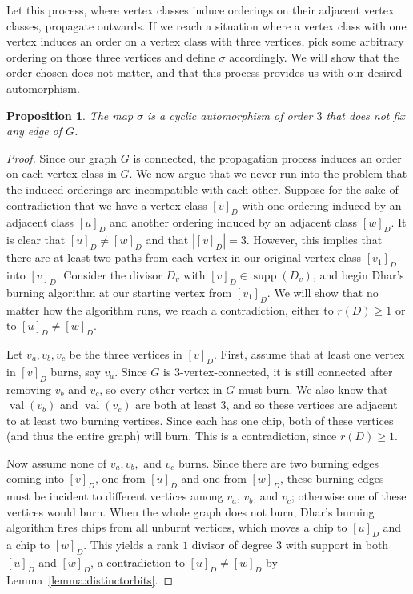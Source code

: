 \documentclass[10pt]{amsart}
\newtheorem{prop}[theorem]{Proposition}
\DeclareMathOperator{\val}{val}
\DeclareMathOperator{\supp}{supp}
\begin{document}
Let this process, where vertex classes induce orderings on their adjacent vertex classes, propagate outwards. If we reach a situation where a vertex class with one vertex induces an order on a vertex class with three vertices, pick some arbitrary ordering on those three vertices and define $\sigma$ accordingly. We will show that the order chosen does not matter, and that this process provides us with our desired automorphism.

\begin{prop}
\label{prop:cyclic}
The map $\sigma$ is a cyclic automorphism of order $3$ that does not fix any edge of $G$.
\end{prop}

\begin{proof}
Since our graph $G$ is connected, the propagation process induces an order on each vertex class in $G$. We now argue that we never run into the problem that the induced orderings are incompatible with each other. Suppose for the sake of contradiction that we have a vertex class $[v]_D$ with one ordering induced by an adjacent class $[u]_D$ and another ordering induced by an adjacent class $[w]_D$. It is clear that $[u]_D \neq [w]_D$ and that $| [v]_D | = 3$. However, this implies that there are at least two paths from each vertex in our original vertex class $[v_1]_D$ into $[v]_D$. Consider the divisor $D_{v}$ with $[v]_D \in \supp (D_v)$, and begin Dhar's burning algorithm at our starting vertex from $[v_1]_D$. We will show that no matter how the algorithm runs, we reach a contradiction, either to $r(D)\geq 1$ or to $[u]_D\neq [w]_D$.

Let $v_a,v_b,v_c$ be the three vertices in $[v]_D$. First, assume that at least one vertex in $[v]_D$ burns, say $v_a$. Since $G$ is $3$-vertex-connected, it is still connected after removing $v_b$ and $v_c$, so every other vertex in $G$ must burn. We also know that $\val(v_b)$ and $\val(v_c)$ are both at least $3$, and so these vertices are adjacent to at least two burning vertices. Since each has one chip, both of these vertices (and thus the entire graph) will burn. This is a contradiction, since $r(D)\geq 1$.

Now assume none of $v_a,v_b,$ and $v_c$ burns. Since there are two burning edges coming into $[v]_D$, one from $[u]_D$ and one from $[w]_D$, these burning edges must be incident to different vertices among $v_a$, $v_b$, and $v_c$; otherwise one of these vertices would burn. When the whole graph does not burn, Dhar's burning algorithm fires chips from all unburnt vertices, which moves a chip to $[u]_D$ and a chip to $[w]_D$. This yields a rank $1$ divisor of degree $3$ with support in both $[u]_D$ and $[w]_D$, a contradiction to $[u]_D\neq [w]_D$ by Lemma~\ref{lemma:distinctorbits}.


\end{proof}
\end{document}
